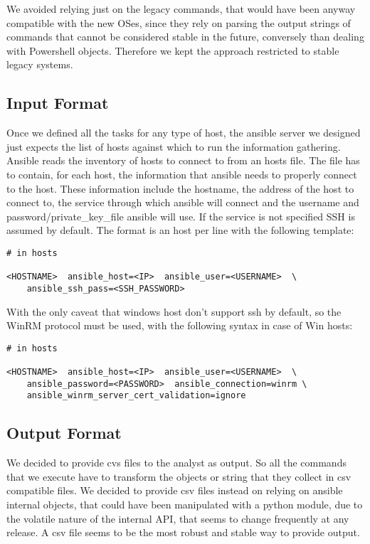 \documentclass[11pt]{article}
\begin{document}
We avoided relying just on the legacy commands, that would have been anyway compatible with the new OSes, since they rely on parsing the output strings of commands that cannot be considered stable in the future, conversely than dealing with Powershell objects. Therefore we kept the approach restricted to stable legacy systems.

\subsection{Input Format}

Once we defined all the tasks for any type of host, the ansible server we designed just expects the list of hosts against which to run the information gathering. Ansible reads the inventory of hosts to connect to from an hosts file. The file has to contain, for each host, the information that ansible needs to properly connect to the host. These information include the hostname, the address of the host to connect to, the service through which ansible will connect and the username and password/private\_key\_file ansible will use. If the service is not specified SSH is assumed by default. The format is an host per line with the following template:

\begin{verbatim}
# in hosts

<HOSTNAME>  ansible_host=<IP>  ansible_user=<USERNAME>  \
    ansible_ssh_pass=<SSH_PASSWORD>
\end{verbatim}

With the only caveat that windows host don't support ssh by default, so the WinRM protocol must be used, with the following syntax in case of Win hosts:

\begin{verbatim}
# in hosts

<HOSTNAME>  ansible_host=<IP>  ansible_user=<USERNAME>  \
    ansible_password=<PASSWORD>  ansible_connection=winrm \
    ansible_winrm_server_cert_validation=ignore
\end{verbatim}

\subsection{Output Format}

We decided to provide cvs files to the analyst as output. So all the commands that we execute have to transform the objects or string that they collect in csv compatible files. We decided to provide csv files instead on relying on ansible internal objects, that could have been manipulated with a python module, due to the volatile nature of the internal API, that seems to change frequently at any release. A csv file seems to be the most robust and stable way to provide output.
\end{document}

